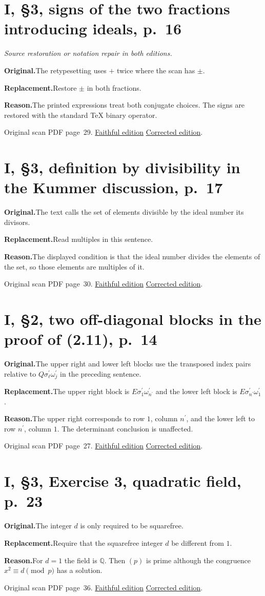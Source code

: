 \documentclass[11pt,a4paper]{article}
\newcommand{\original}{\par\smallskip\noindent\textbf{Original.}\enspace}
\newcommand{\replacement}{\par\smallskip\noindent\textbf{Replacement.}\enspace}
\newcommand{\reason}{\par\smallskip\noindent\textbf{Reason.}\enspace}
\newcommand{\editionlink}[3]{\href{#1\#errata.#2}{#3}}
\newcommand{\location}[2]{%
  \par\smallskip\noindent Original scan PDF page~#2.\enspace
  \editionlink{Neukirch_Faithful.pdf}{#1}{Faithful edition}
  \quad\editionlink{Neukirch_Corrected.pdf}{#1}{Corrected edition}.}
\begin{document}
\setcounter{section}{64}
\section{I, \S3, signs of the two fractions introducing ideals, p.~16}\label{errata:item:65}
\noindent\emph{Source restoration or notation repair in both editions.}\par
\original The retypesetting uses $+$ twice where the scan has $\pm$.
\replacement Restore $\pm$ in both fractions.
\reason The printed expressions treat both conjugate choices. The signs are restored with the standard TeX binary operator.
\location{65}{29}

\setcounter{section}{65}
\section{I, \S3, definition by divisibility in the Kummer discussion, p.~17}\label{errata:item:66}

\original The text calls the set of elements divisible by the ideal number its divisors.
\replacement Read multiples in this sentence.
\reason The displayed condition is that the ideal number divides the elements of the set, so those elements are multiples of it.
\location{66}{30}

\setcounter{section}{66}
\section{I, \S2, two off-diagonal blocks in the proof of (2.11), p.~14}\label{errata:item:67}

\original The upper right and lower left blocks use the transposed index pairs relative to $Q\sigma_\ell^{\prime}\omega_j^{\prime}$ in the preceding sentence.
\replacement The upper right block is $E\sigma_1^{\prime}\omega_{n^{\prime}}^{\prime}$ and the lower left block is $E\sigma_{n^{\prime}}^{\prime}\omega_1^{\prime}$.
\reason The upper right corresponds to row $1$, column $n^{\prime}$, and the lower left to row $n^{\prime}$, column $1$. The determinant conclusion is unaffected.
\location{67}{27}

\setcounter{section}{67}
\section{I, \S3, Exercise 3, quadratic field, p.~23}\label{errata:item:68}

\original The integer $d$ is only required to be squarefree.
\replacement Require that the squarefree integer $d$ be different from $1$.
\reason For $d=1$ the field is $\mathbb Q$. Then $(p)$ is prime although the congruence $x^2\equiv d\pmod p$ has a solution.
\location{68}{36}
\end{document}
